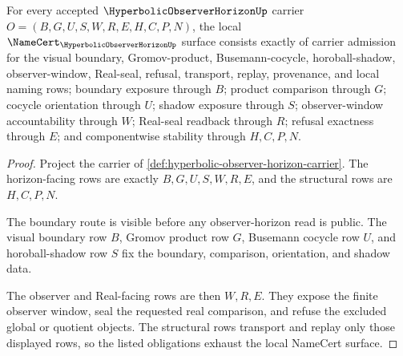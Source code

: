 \begin{theorem}
\label{thm:hyperbolic-observer-horizon-namecert-obligations}
For every accepted $\HyperbolicObserverHorizonUp$ carrier $O=(B,G,U,S,W,R,E,H,C,P,N)$, the local $\NameCert_{\HyperbolicObserverHorizonUp}$ surface consists exactly of carrier admission for the visual boundary, Gromov-product, Busemann-cocycle, horoball-shadow, observer-window, Real-seal, refusal, transport, replay, provenance, and local naming rows; boundary exposure through $B$; product comparison through $G$; cocycle orientation through $U$; shadow exposure through $S$; observer-window accountability through $W$; Real-seal readback through $R$; refusal exactness through $E$; and componentwise stability through $H,C,P,N$.
\end{theorem}
\begin{proof}
Project the carrier of \autoref{def:hyperbolic-observer-horizon-carrier}. The horizon-facing rows are exactly $B,G,U,S,W,R,E$, and the structural rows are $H,C,P,N$.

The boundary route is visible before any observer-horizon read is public. The visual boundary row $B$, Gromov product row $G$, Busemann cocycle row $U$, and horoball-shadow row $S$ fix the boundary, comparison, orientation, and shadow data.

The observer and Real-facing rows are then $W,R,E$. They expose the finite observer window, seal the requested real comparison, and refuse the excluded global or quotient objects. The structural rows transport and replay only those displayed rows, so the listed obligations exhaust the local NameCert surface.
\end{proof}

